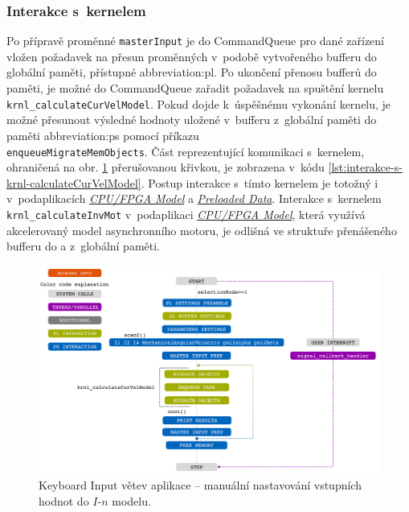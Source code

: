 \documentclass[a4paper, twoside, 11pt]{article}
\begin{document}
			\subsubsection{Interakce s~kernelem}
			Po přípravě proměnné \texttt{masterInput} je do CommandQueue pro dané zařízení vložen požadavek na přesun proměnných v~podobě vytvořeného bufferu do globální paměti, přístupné \gls{abbreviation:pl}. Po ukončení přenosu bufferů do paměti, je možné do CommandQueue zařadit požadavek na spuštění kernelu\\\texttt{krnl\_calculateCurVelModel}. Pokud dojde k~úspěšnému vykonání kernelu, je možné přesunout výsledné hodnoty uložené v~bufferu z~globální paměti do paměti \gls{abbreviation:ps} pomocí příkazu\\\texttt{enqueueMigrateMemObjects}. Část reprezentující komunikaci s~kernelem, ohraničená na obr. \ref{fig:keyboard-input} přerušovanou křivkou, je zobrazena v~kódu \ref{lst:interakce-s-krnl-calculateCurVelModel}. Postup interakce s~tímto kernelem je totožný i v~podaplikacích \hyperref[subsec:cpu-fpga]{\textit{CPU/FPGA Model}} a \hyperref[subsec:preloaded-data]{\textit{Preloaded Data}}. Interakce s~kernelem \texttt{krnl\_calculateInvMot} v~podaplikaci \hyperref[subsec:cpu-fpga]{\textit{CPU/FPGA Model}}, která využívá akcelerovaný model asynchronního motoru, je odlišná ve struktuře přenášeného bufferu do a z~globální paměti.\par

 		\begin{figure}[htbp!]
			\centering
			\includegraphics[width=1\textwidth]{src/pdf/keyboard-input.pdf}
			\caption{Keyboard Input větev aplikace – manuální nastavování vstupních hodnot do $I$-$n$ modelu.}
			\label{fig:keyboard-input}
		\end{figure}
\end{document}
